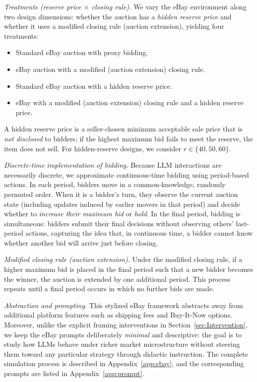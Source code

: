 \emph{Treatments (reserve price $\times$ closing rule).}
We vary the eBay environment along two design dimensions: whether the auction has a \emph{hidden reserve price} and whether it uses a modified closing rule (auction extension), yielding four treatments:
\begin{itemize}
    \item[\textbf{T1}] Standard eBay auction with proxy bidding.
    \item[\textbf{T2}] eBay auction with a modified (auction extension) closing rule.
    \item[\textbf{T3}] Standard eBay auction with a hidden reserve price.
    \item[\textbf{T4}] eBay with a modified (auction extension) closing rule and a hidden reserve price.
\end{itemize}
A hidden reserve price is a seller-chosen minimum acceptable sale price that is \emph{not disclosed} to bidders; if the highest maximum bid fails to meet the reserve, the item does not sell. For hidden-reserve designs, we consider $r \in \{40, 50, 60\}$.

\emph{Discrete-time implementation of bidding.}
Because LLM interactions are necessarily discrete, we approximate continuous-time bidding using period-based actions. In each period, bidders move in a common-knowledge, randomly permuted order. When it is a bidder's turn, they observe the current auction state (including updates induced by earlier movers in that period) and decide whether to \emph{increase their maximum bid} or \emph{hold}. In the final period, bidding is simultaneous: bidders submit their final decisions without observing others' last-period actions, capturing the idea that, in continuous time, a bidder cannot know whether another bid will arrive just before closing.

\emph{Modified closing rule (auction extension).}
Under the modified closing rule, if a higher maximum bid is placed in the final period such that a new bidder becomes the winner, the auction is extended by one additional period. This process repeats until a final period occurs in which no further bids are made.

\emph{Abstraction and prompting.}
This stylized eBay framework abstracts away from additional platform features such as shipping fees and Buy-It-Now options. Moreover, unlike the explicit framing interventions in Section~\ref{sec:Intervention}, we keep the eBay prompts deliberately \emph{minimal} and descriptive: the goal is to study how LLMs behave under richer market microstructure without steering them toward any particular strategy through didactic instruction. The complete simulation process is described in Appendix~\ref{app:ebay}, and the corresponding prompts are listed in Appendix~\ref{app:prompt}.

